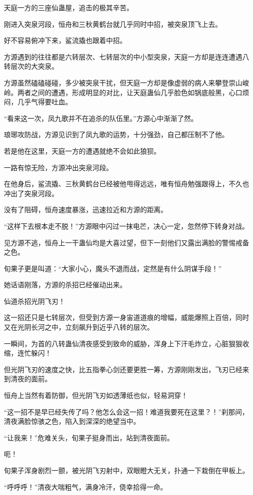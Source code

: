 \begin{this_body}
天庭一方的三座仙蛊屋，追击的极其辛苦。

刚进入突泉河段，恒舟和三秋黄鹤台就几乎同时中招，被突泉顶飞上去。

好不容易俯冲下来，鲨流撬也跟着中招。

方源遇到的往往都是六转层次、七转层次的中小型突泉，天庭一方却是连连遭遇八转层次的大突泉。

方源虽然磕磕碰碰，多少被突泉干扰，但天庭一方却是像虚弱的病人来攀登崇山峻岭。两者之间的遭遇，形成明显的对比，让天庭蛊仙几乎脸色如锅底般黑，心口烦闷，几乎气得要吐血。

“看来这一次，凤九歌并不在追杀的队伍里。”方源心中渐渐了然。

琅琊攻防战，方源见识到了凤九歌的运势，十分强劲，自己都压制不了他。

若是他在这里，天庭一方的遭遇就绝不会如此狼狈。

一路有惊无险，方源冲出突泉河段。

在他身后，鲨流撬、三秋黄鹤台已经被他甩得远远，唯有恒舟勉强跟得上，不久也冲出了突泉河段。

没有了阻碍，恒舟速度暴涨，迅速拉近和方源的距离。

“这样下去根本走不脱！”方源眼中闪过一抹电芒，决心一定，忽然停下转身对战。

见方源不逃，恒舟上一干蛊仙均是大喜过望，但下一刻他们又露出满脸的警惕戒备之色。

旬果子更是叫道：“大家小心，魔头不退而战，定然是有什么阴谋手段！”

她话语刚落，方源的杀招已经催动出来。

仙道杀招光阴飞刃！

这一招还只是七转层次，但受到方源一身宙道道痕的增幅，威能爆照上百倍，同时又在光阴长河之中，立刻飙升到近乎八转的层次。

一瞬间，为首的八转蛊仙清夜感受到致命的威胁，浑身上下汗毛炸立，心脏狠狠收缩，连忙躲闪！

但光阴飞刃的速度之快，比五指拳心剑还要更胜一筹，方源刚刚发出，飞刃已经来到清夜的面前。

恒舟上当然有着防御，但光阴飞刃如透薄纸也似，轻易洞穿！

“这一招不是早已经失传了吗？他怎么会这一招！难道我要死在这里？！”刹那间，清夜满脸惊骇之色，陷入到深深的绝望当中。

“让我来！”危难关头，旬果子挺身而出，站到清夜面前。

呃！

旬果子浑身剧烈一颤，被光阴飞刃射中，双眼瞪大无关，扑通一下栽倒在甲板上。

“呼呼呼！”清夜大喘粗气，满身冷汗，侥幸拾得一命。


\end{this_body}

